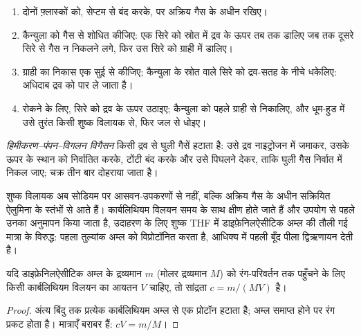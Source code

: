 \begin{method}[कैन्युला स्थानांतरण]\label{met:b3:lab-techniques-3:cannula}
\begin{enumerate}
  \item दोनों फ़्लास्कों को, सेप्टम से बंद करके,  पर अक्रिय गैस के अधीन रखिए।
  \item कैन्युला को गैस से शोधित कीजिए: एक सिरे को स्रोत में द्रव के ऊपर
        तब तक डालिए जब तक दूसरे सिरे से गैस न निकलने लगे, फिर उस सिरे को ग्राही में डालिए।
  \item ग्राही का निकास एक सुई से कीजिए; कैन्युला के स्रोत वाले सिरे को
        द्रव-सतह के नीचे धकेलिए: अधिदाब द्रव को पार ले जाता है।
  \item रोकने के लिए, सिरे को द्रव के ऊपर उठाइए; कैन्युला को पहले ग्राही से
        निकालिए, और धूम-हुड में उसे तुरंत किसी शुष्क विलायक से, फिर जल से धोइए।
\end{enumerate}
\end{method}

\begin{definition}\label{def:b3:lab-techniques-3:degassing}
\emph{हिमीकरण--पंपन--विगलन विगैसन} किसी द्रव से
घुली गैसें हटाता है: उसे द्रव नाइट्रोजन में जमाकर, उसके ऊपर के स्थान को निर्वातित करके,
टोंटी बंद करके और उसे पिघलने देकर, ताकि घुली गैस
निर्वात में निकल जाए; चक्र तीन बार दोहराया जाता है।
\end{definition}

शुष्क विलायक अब सोडियम पर आसवन-उपकरणों से नहीं, बल्कि अक्रिय गैस के अधीन सक्रियित ऐलुमिना के
स्तंभों से आते हैं। कार्बलिथियम विलयन समय के साथ क्षीण होते जाते हैं
और उपयोग से पहले उनका अनुमापन किया जाता है, उदाहरण के लिए शुष्क THF में
डाइफ़ेनिलऐसीटिक अम्ल की तौली गई मात्रा के विरुद्ध: पहला तुल्यांक अम्ल को विप्रोटॉनित करता है,
आधिक्य में पहली बूँद पीला द्विऋणायन देती है।

\begin{proposition}[किसी कार्बलिथियम का अनुमापांक]\label{prop:b3:lab-techniques-3:titre}
यदि डाइफ़ेनिलऐसीटिक अम्ल के द्रव्यमान $m$ (मोलर द्रव्यमान $M$) को रंग-परिवर्तन तक पहुँचने के लिए
किसी कार्बलिथियम विलयन का आयतन $V$ चाहिए, तो सांद्रता $c = m/(MV)$ है।
\end{proposition}

\begin{proof}
अंत्य बिंदु तक प्रत्येक कार्बलिथियम अम्ल से एक प्रोटॉन हटाता है; अम्ल
समाप्त होने पर रंग प्रकट होता है। मात्राएँ बराबर हैं: $cV = m/M$।
\end{proof}

